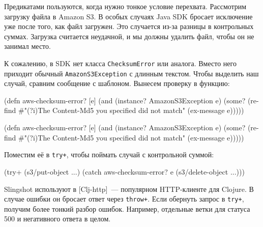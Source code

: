 
Предикатами пользуются, когда нужно тонкое условие перехвата. Рассмотрим
загрузку файла в Amazon S3. В особых случаях Java SDK бросает исключение уже
после того, как файл загружен. Это случается из-за разницы в контрольных
суммах. Загрузка считается неудачной, и мы должны удалить файл, чтобы он не
занимал место.

\mnoindent
К сожалению, в SDK нет класса \verb|ChecksumError| или аналога. Вместо него
приходит обычный \verb|AmazonS3Exception| с длинным текстом. Чтобы выделить
наш случай, сравним сообщение с шаблоном. Вынесем проверку в функцию:

\ifx\DEVICETYPE\MOBILE

\begin{english}
  \begin{clojure}
(defn aws-checksum-error? [e]
  (and
    (instance? AmazonS3Exception e)
    (some?
      (re-find
        #"(?i)The Content-Md5
            you specified did not match"
        (ex-message e)))))
  \end{clojure}
\end{english}

\else

\begin{english}
  \begin{clojure}
(defn aws-checksum-error? [e]
  (and (instance? AmazonS3Exception e)
       (some?
        (re-find
         #"(?i)The Content-Md5 you specified did not match"
         (ex-message e)))))
  \end{clojure}
\end{english}

\fi

\noindent
Поместим её в \verb|try+|, чтобы поймать случай с контрольной суммой:

\begin{english}
  \begin{clojure}
(try+
  (s3/put-object ...)
  (catch aws-checksum-error? e
    (s3/delete-object ...)))
  \end{clojure}
\end{english}

Slingshot используют в [Clj-http]~---
популярном HTTP-клиенте для Clojure. В случае ошибки он бросает ответ через
\verb|throw+|. Если обернуть запрос в \verb|try+|, получим более тонкий
разбор ошибок. Например, отдельные ветки для статуса 500 и негативного ответа в
целом.

